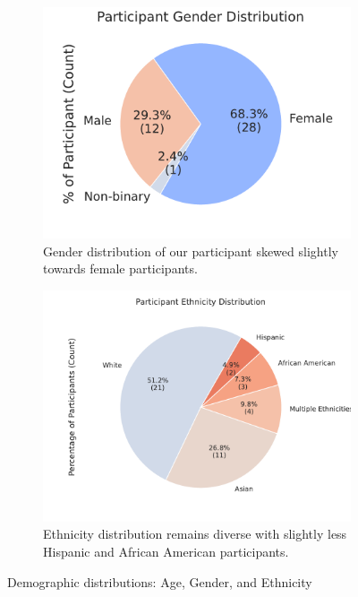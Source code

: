 \begin{figure}[h]
    \begin{subfigure}[b]{0.45\textwidth}
        \centering
        \includegraphics[width=\textwidth]{content/image/demo/demo_gender.pdf}
        \caption{Gender distribution of our participant skewed slightly towards female participants.}
        \label{fig:demoGender}
    \end{subfigure}
    \hfill
    \begin{subfigure}[b]{0.45\textwidth}
        \centering
        \includegraphics[width=\textwidth]{content/image/demo/demo_ethnicity.pdf}
        \caption{Ethnicity distribution remains diverse with slightly less Hispanic and African American participants.}
        \label{fig:demoEthnicity}
    \end{subfigure}
    
    \caption{Demographic distributions: Age, Gender, and Ethnicity}
    \label{fig:Demographics}
\end{figure}

